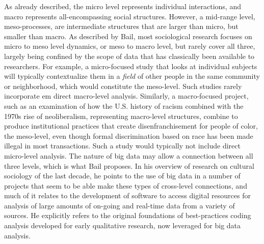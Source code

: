 \documentclass[sigconf]{acmart}
\begin{document}
As already described, the micro level represents individual interactions, and macro represents all-encompassing social structures.  However, a mid-range level, meso-processes, are intermediate structures that are larger than micro, but smaller than macro.  As described by Bail, most sociological research focuses on micro to meso level dynamics, or meso to macro level, but rarely cover all three, largely being confined by the scope of data that has classically been available to researchers. \cite{bail14} For example, a micro-focused study that looks at individual subjects will typically contextualize them in a {\em field} of other people in the same community or neighborhood, which would constitute the meso-level.  Such studies rarely incorporate {em direct} macro-level analysis.  Similarly, a macro-focused project, such as an examination of how the U.S. history of racism combined with the 1970s rise of neoliberalism, representing macro-level structures, combine to produce institutional practices that create disenfranchisement for people of color, the meso-level, even though formal discrimination based on race has been made illegal in most transactions.  Such a study would typically not include direct micro-level analysis.  The nature of big data may allow a connection between all three levels, which is what Bail proposes.  In his overview of research on cultural sociology of the last decade, he points to the use of big data in a number of projects that seem to be able make these types of cross-level connections, and much of it relates to the development of software to access digital resources for analysis of large amounts of on-going and real-time data from a variety of sources.  He explicitly refers to the original foundations of best-practices coding analysis developed for early qualitative research, now leveraged for big data analysis. \cite{bail14}
\end{document}
